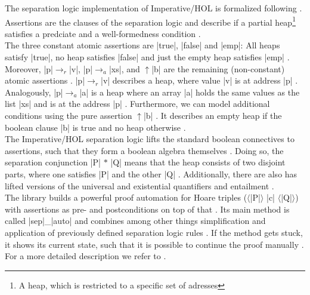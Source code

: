 The separation logic implementation of Imperative/HOL \parencite{Separation_Logic_Imperative_HOL-AFP} is formalized following \cite{Calcagno2007} \parencite{Lammich_2017}. Assertions are the clauses of the separation logic and describe if a partial heap\footnote{A heap, which is restricted to a specific set of adresses} satisfies a predciate and a well-formedness condition \parencite[p.482]{Lammich_2017}.\\
The three constant atomic assertions are |true|, |false| and |emp|: All heaps satisfy |true|, no heap satisfies |false| and just the empty heap satisfies |emp| \parencite[p.482]{Lammich_2017}. Moreover, |p|$\rightarrow_r$|v|, |p|$\rightarrow_a$|xs|, and $\uparrow$|b| are the remaining (non-constant) atomic assertions \parencite{Lammich_2017}. |p|$\rightarrow_r$|v| describes a heap, where value |v| is at address |p| \parencite{Lammich_2017}. Analogously, |p|$\rightarrow_a$|a| is a heap where an array |a| holds the same values as the list |xs| and is at the address |p| \parencite{Lammich_2017}. Furthermore, we can model additional conditions using the pure assertion $\uparrow$|b| \parencite{Lammich_2017}. It describes an empty heap if the boolean clause |b| is true and no heap otherwise \parencite{Lammich_2017}.\\
The Imperative/HOL separation logic lifts the standard boolean connectives to assertions, such that they form a boolean algebra themselves \parencite{Lammich_2017}. Doing so, the separation conjunction |P| $*$ |Q| means that the heap consists of two disjoint parts, where one satisfies |P| and the other |Q| \parencite[p.483]{Lammich_2017}. Additionally, there are also has lifted versions of the universal and existential quantifiers and entailment \parencite{Lammich_2017}.\\
The library builds a powerful proof automation for Hoare triples ($\langle$|P|$\rangle$ |c| $\langle$|Q|$\rangle$\footnotemark) with assertions as pre- and postconditions on top of that \parencite{Lammich_2017}. Its main method is called |sep|\_|auto| and combines among other things simplification and application of previously defined separation logic rules \parencite{Lammich_2017}. If the method gets stuck, it shows its current state, such that it is possible to continue the proof manually \parencite{Lammich_2017}. For a more detailed description we refer to \cite{Lammich_2017}.

